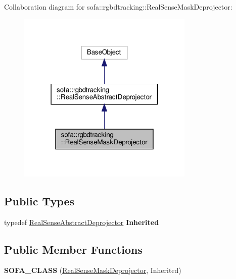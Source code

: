 Collaboration diagram for sofa\+:\+:rgbdtracking\+:\+:Real\+Sense\+Mask\+Deprojector\+:
\nopagebreak
\begin{figure}[H]
\begin{center}
\leavevmode
\includegraphics[width=238pt]{classsofa_1_1rgbdtracking_1_1_real_sense_mask_deprojector__coll__graph}
\end{center}
\end{figure}
\subsection*{Public Types}
\begin{DoxyCompactItemize}
\item 
\mbox{\label{classsofa_1_1rgbdtracking_1_1_real_sense_mask_deprojector_aa8f05cf5049f6cef0ea54ba40efa0727}} 
typedef \hyperlink{classsofa_1_1rgbdtracking_1_1_real_sense_abstract_deprojector}{Real\+Sense\+Abstract\+Deprojector} {\bfseries Inherited}
\end{DoxyCompactItemize}
\subsection*{Public Member Functions}
\begin{DoxyCompactItemize}
\item 
\mbox{\label{classsofa_1_1rgbdtracking_1_1_real_sense_mask_deprojector_a7661938009502eb3591b1cf196b3489d}} 
{\bfseries S\+O\+F\+A\+\_\+\+C\+L\+A\+SS} (\hyperlink{classsofa_1_1rgbdtracking_1_1_real_sense_mask_deprojector}{Real\+Sense\+Mask\+Deprojector}, Inherited)
\end{DoxyCompactItemize}
